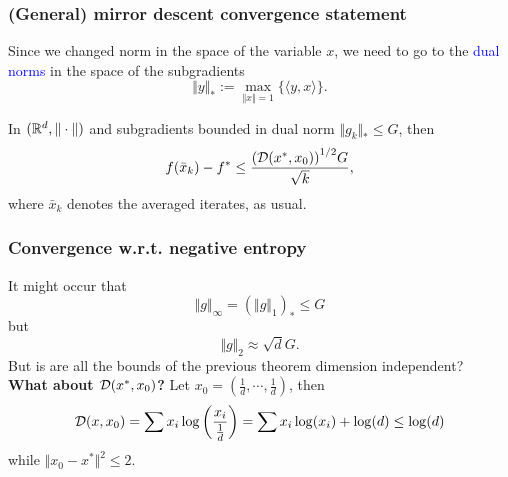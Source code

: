 \documentclass{beamer}
\begin{document}



\begin{frame}
  \frametitle{(General) mirror descent convergence statement}
  Since we changed norm in the space of the variable $x$, we need to go to the \textcolor{blue}{dual norms} in the space of the subgradients
  \begin{equation}
    \Vert y \Vert_* := \max_{\Vert x \Vert=1} \{ \langle y, x \rangle\}.
  \end{equation}
  \begin{theorem}
    In $(\mathbb{R}^d, \Vert \cdot \Vert)$ and subgradients bounded in dual norm $\Vert g_k \Vert_* \le G$, then
    \begin{equation}
      f(\bar{x}_k) - f^* \le \frac{{(\mathcal{D}(x^*, x_0))}^{1/2} G}{\sqrt{k}},
    \end{equation}
    where $\bar{x}_k$ denotes the averaged iterates, as usual.
  \end{theorem}
\end{frame}


\begin{frame}
  \frametitle{Convergence w.r.t. negative entropy}
    It might occur that
    \begin{equation}
      \Vert g \Vert_\infty = (\Vert g \Vert_1)_* \le G
    \end{equation}
    but
    \begin{equation}
      \Vert g \Vert_2 \approx \sqrt{d} G.
    \end{equation}
    But is are all the bounds of the previous theorem dimension independent?\\
    \textbf{What about $\mathcal{D}(x^*, x_0) $?}
    Let $x_0 = (\frac{1}{d}, \cdots , \frac{1}{d})$, then
    \begin{equation}
      \mathcal{D}(x, x_0) = \sum x_i \log\left(\frac{x_i}{\frac1d}\right) = \sum x_i \log(x_i) + \log(d) \le \log(d)
    \end{equation}
    while $ \Vert x_0 - x^* \Vert^2 \le 2$.

\end{frame}
\end{document}
